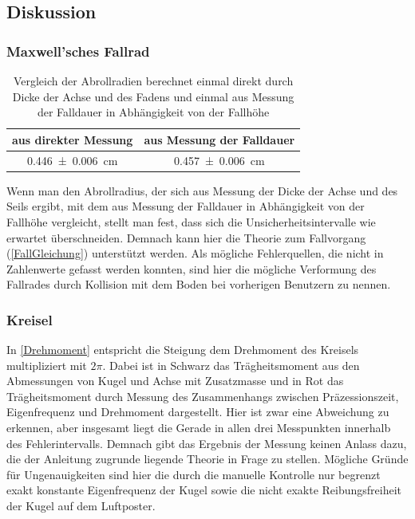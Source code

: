 \documentclass[
	a4paper,
	12pt,
	pagesize,
	ngerman
]{scrartcl}
\begin{document}
	\subsection{Diskussion}
	\subsubsection{Maxwell'sches Fallrad}
	
	\begin{table}[tb]
		\centering
		\begin{tabular}{ c | c }
			aus direkter Messung & aus Messung der Falldauer\\ \hline
			\SI{0,446 \pm 0,006}{cm} & \SI{0,457 \pm 0,006}{cm} \\
		\end{tabular}
		\caption{Vergleich der Abrollradien berechnet einmal direkt durch Dicke der Achse und des Fadens und einmal aus Messung der Falldauer in Abhängigkeit von der Fallhöhe}
		\label{Abrollradius_Vergleich} 
	\end{table}
	Wenn man den Abrollradius, der sich aus Messung der Dicke der Achse und des Seils ergibt, mit dem aus Messung der Falldauer in Abhängigkeit von der Fallhöhe vergleicht, stellt man fest, dass sich die Unsicherheitsintervalle wie erwartet überschneiden.
	Demnach kann hier die Theorie zum Fallvorgang (\cref{FallGleichung}) unterstützt werden.
	Als mögliche Fehlerquellen, die nicht in Zahlenwerte gefasst werden konnten, sind hier die mögliche Verformung des Fallrades durch Kollision mit dem Boden bei vorherigen Benutzern zu nennen.
	
	\subsubsection{Kreisel}
	In \cref{Drehmoment} entspricht die Steigung dem Drehmoment des Kreisels multipliziert mit $2 \pi $.
	Dabei ist in Schwarz das Trägheitsmoment aus den Abmessungen von Kugel und Achse mit Zusatzmasse und in Rot das Trägheitsmoment durch Messung des Zusammenhangs zwischen Präzessionszeit, Eigenfrequenz und Drehmoment dargestellt.
	Hier ist zwar eine Abweichung zu erkennen, aber insgesamt liegt die Gerade in allen drei Messpunkten innerhalb des Fehlerintervalls.
	Demnach gibt das Ergebnis der Messung keinen Anlass dazu, die der Anleitung zugrunde liegende Theorie in Frage zu stellen.
	Mögliche Gründe für Ungenauigkeiten sind hier die durch die manuelle Kontrolle nur begrenzt exakt konstante Eigenfrequenz der Kugel sowie die nicht exakte Reibungsfreiheit der Kugel auf dem Luftposter.
	
\end{document}
